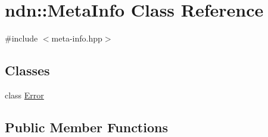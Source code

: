 \hypertarget{classndn_1_1MetaInfo}{}\section{ndn\+:\+:Meta\+Info Class Reference}
\label{classndn_1_1MetaInfo}


{\ttfamily \#include $<$meta-\/info.\+hpp$>$}

\subsection*{Classes}
\begin{DoxyCompactItemize}
\item 
class \hyperlink{classndn_1_1MetaInfo_1_1Error}{Error}
\end{DoxyCompactItemize}
\subsection*{Public Member Functions}
